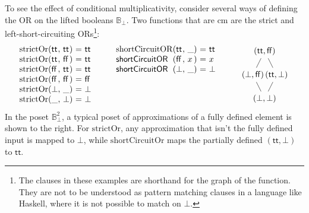 \begin{example}
  \label{ex:strict-short-circuit}
  To see the effect of conditional multiplicativity, consider several
  ways of defining the OR on the lifted booleans
  $\mathbb{B}_\bot$. Two functions that are cm are the strict and
  left-short-circuiting ORs\footnote{The clauses in these examples are
    shorthand for the graph of the function. They are not to be
    understood as pattern matching clauses in a language like Haskell,
    where it is not possible to match on $\bot$.}:
  \begin{displaymath}
    \begin{array}[t]{l@{(}l@{,~}l@{)~}c@{~}l}
      \mathrm{strictOr}&\mathsf{tt}&\mathsf{tt}&=&\mathsf{tt} \\
      \mathrm{strictOr}&\mathsf{tt}&\mathsf{ff}&=&\mathsf{tt} \\
      \mathrm{strictOr}&\mathsf{ff}&\mathsf{tt}&=&\mathsf{tt} \\
      \mathrm{strictOr}&\mathsf{ff}&\mathsf{ff}&=&\mathsf{ff} \\
      \mathrm{strictOr}&\bot&\_&=&\bot \\
      \mathrm{strictOr}&\_&\bot&=&\bot \\
    \end{array}
    \qquad
    \begin{array}[t]{l@{(}l@{,~}l@{)~}c@{~}l}
      \mathrm{shortCircuitOR}&\mathsf{tt}&\_&=&\mathsf{tt} \\
      \mathsf{shortCircuitOR}&\mathsf{ff}&x&=&x \\
      \mathsf{shortCircuitOR}&\bot&\_& =& \bot
    \end{array}
    \qquad
    \raisebox{-15ex}{
      \begin{tikzpicture}
        \node (top) at (0,0) {$(\mathsf{tt},\mathsf{ff})$};
        \node [below of=top,xshift=-0.5cm] (oi) {$(\bot,\mathsf{ff})$};
        \node [below of=top,xshift=0.5cm] (io) {$(\mathsf{tt},\bot)$};
        \node [below of=oi,xshift=0.5cm] (oo) {$(\bot,\bot)$};
        \draw (top) -- (oi);
        \draw (top) -- (io);
        \draw (oi) -- (oo);
        \draw (io) -- (oo);
      \end{tikzpicture}
    }
  \end{displaymath}
  In the poset $\mathbb{B}_\bot^2$, a typical poset of approximations of a fully defined element is shown to
  the right. For $\mathrm{strictOr}$, any approximation that isn't the fully defined input is mapped to
  $\bot$, while $\mathrm{shortCircuitOr}$ maps the partially defined $(\mathsf{tt},\bot)$ to $\mathsf{tt}$.

\end{example}
